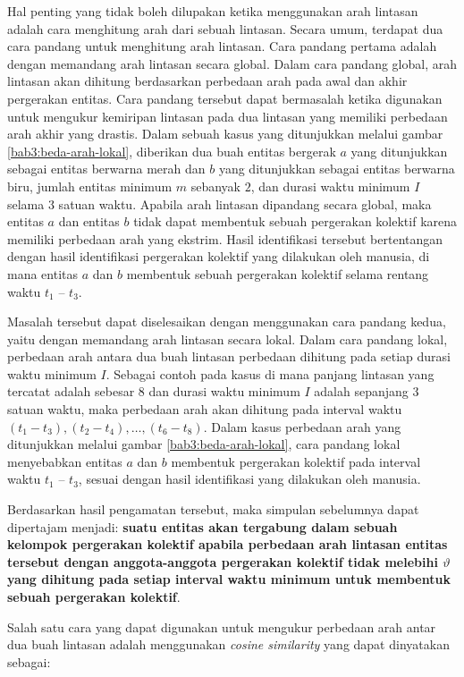 Hal penting yang tidak boleh dilupakan ketika menggunakan arah lintasan adalah cara menghitung arah dari sebuah lintasan. Secara umum, terdapat dua cara pandang untuk menghitung arah lintasan. Cara pandang pertama adalah dengan memandang arah lintasan secara global. Dalam cara pandang global, arah lintasan akan dihitung berdasarkan perbedaan arah pada awal dan akhir pergerakan entitas. Cara pandang tersebut dapat bermasalah ketika digunakan untuk mengukur kemiripan lintasan pada dua lintasan yang memiliki perbedaan arah akhir yang drastis. Dalam sebuah kasus yang ditunjukkan melalui gambar \ref{bab3:beda-arah-lokal}, diberikan dua buah entitas bergerak $a$ yang ditunjukkan sebagai entitas berwarna merah dan $b$ yang ditunjukkan sebagai entitas berwarna biru, jumlah entitas minimum $m$ sebanyak $2$, dan durasi waktu minimum $I$ selama $3$ satuan waktu. Apabila arah lintasan dipandang secara global, maka entitas $a$ dan entitas $b$ tidak dapat membentuk sebuah pergerakan kolektif karena memiliki perbedaan arah yang ekstrim. Hasil identifikasi tersebut bertentangan dengan hasil identifikasi pergerakan kolektif yang dilakukan oleh manusia, di mana entitas $a$ dan $b$ membentuk sebuah pergerakan kolektif selama rentang waktu $t_1$ -- $t_3$.

Masalah tersebut dapat diselesaikan dengan menggunakan cara pandang kedua, yaitu dengan memandang arah lintasan secara lokal. Dalam cara pandang lokal, perbedaan arah antara dua buah lintasan perbedaan dihitung pada setiap durasi waktu minimum $I$. Sebagai contoh pada kasus di mana panjang lintasan yang tercatat adalah sebesar $8$ dan durasi waktu minimum $I$ adalah sepanjang $3$ satuan waktu, maka perbedaan arah akan dihitung pada interval waktu $(t_1 - t_3), (t_2 - t_4), \ldots, (t_6 - t_8)$. Dalam kasus perbedaan arah yang ditunjukkan melalui gambar \ref{bab3:beda-arah-lokal}, cara pandang lokal menyebabkan entitas $a$ dan $b$ membentuk pergerakan kolektif pada interval waktu $t_1$ -- $t_3$, sesuai dengan hasil identifikasi yang dilakukan oleh manusia.

Berdasarkan hasil pengamatan tersebut, maka simpulan sebelumnya dapat dipertajam menjadi: \textbf{suatu entitas akan tergabung dalam sebuah kelompok pergerakan kolektif apabila perbedaan arah lintasan entitas tersebut dengan anggota-anggota pergerakan kolektif tidak melebihi $\vartheta$ yang dihitung pada setiap interval waktu minimum untuk membentuk sebuah pergerakan kolektif}.

Salah satu cara yang dapat digunakan untuk mengukur perbedaan arah antar dua buah lintasan adalah menggunakan \textit{cosine similarity} yang dapat dinyatakan sebagai:

